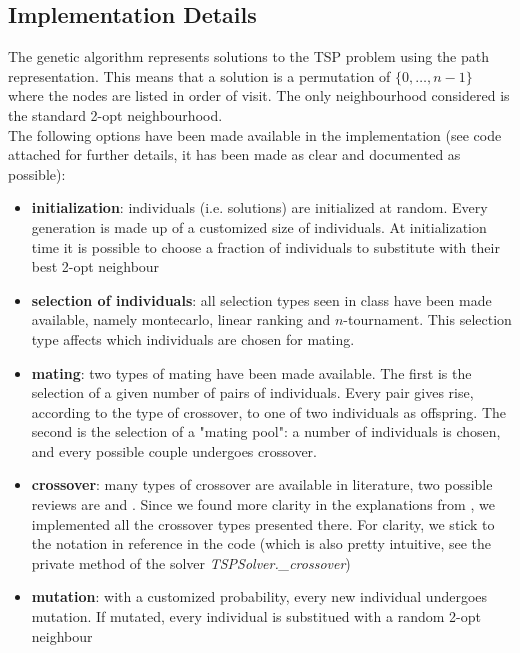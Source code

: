\documentclass{article}
\begin{document}
\subsection{Implementation Details}
The genetic algorithm represents solutions to the TSP problem using the path representation. This means that a solution is a permutation of $\{0, \ldots, n-1\}$ where the nodes are listed in order of visit. The only neighbourhood considered is the standard 2-opt neighbourhood. \\
The following options have been made available in the implementation (see code attached for further details, it has been made as clear and documented as possible):
\begin{itemize}
\item \textbf{initialization}: individuals (i.e. solutions) are initialized at random. Every generation is made up of a customized size of individuals. At initialization time it is possible to choose a fraction of individuals to substitute with their best 2-opt neighbour

\item \textbf{selection of individuals}: all selection types seen in class have been made available, namely montecarlo, linear ranking and $n$-tournament. This selection type affects which individuals are chosen for mating.

\item \textbf{mating}: two types of mating have been made available. The first is the selection of a given number of pairs of individuals. Every pair gives rise, according to the type of crossover, to one of two individuals as offspring. The second is the selection of a "mating pool": a number of individuals is chosen, and every possible couple undergoes crossover.

\item \textbf{crossover}: many types of crossover are available in literature, two possible reviews are \cite{gupta2011study} and \cite{abdoun2012comparative}. Since we found more clarity in the explanations from \cite{gupta2011study}, we implemented all the crossover types presented there. For clarity, we stick to the notation in reference in the code (which is also pretty intuitive, see the private method of the solver \textit{TSPSolver.\_crossover})

\item \textbf{mutation}: with a customized probability, every new individual undergoes mutation. If mutated, every individual is substitued with a random 2-opt neighbour


\end{itemize}
\end{document}
